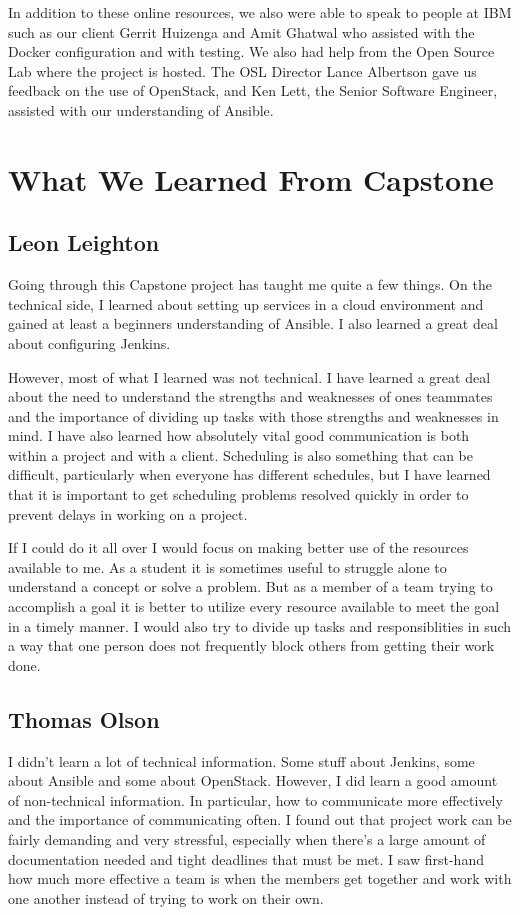 \documentclass[10pt,letterpaper,onecolumn,draftclsnofoot]{IEEEtran}
\begin{document}
In addition to these online resources, we also were able to speak to people at IBM such as our client Gerrit Huizenga
and Amit Ghatwal who assisted with the Docker configuration and with testing. We also had help from the Open Source
Lab where the project is hosted. The OSL Director Lance Albertson gave us feedback on the use of OpenStack, and Ken
Lett, the Senior Software Engineer, assisted with our understanding of Ansible.

\section{What We Learned From Capstone}
\subsection{Leon Leighton}
Going through this Capstone project has taught me quite a few things.
On the technical side, I learned about setting up services in a cloud environment and gained at least a beginners
understanding of Ansible. I also learned a great deal about configuring Jenkins. 

However, most of what I learned was not technical. 
I have learned a great deal about the need to understand the strengths and weaknesses of ones teammates 
and the importance of dividing up tasks with those strengths and weaknesses in mind. 
I have also learned how absolutely vital good communication is both within a project and with a client. 
Scheduling is also something that can be difficult, particularly when everyone has different schedules, but
I have learned that it is important to get scheduling problems resolved quickly in order to prevent delays
in working on a project.

If I could do it all over I would focus on making better use of the resources available to me.
As a student it is sometimes useful to struggle alone to understand a concept or solve a problem.
But as a member of a team trying to accomplish a goal it is better to utilize every resource available to 
meet the goal in a timely manner.
I would also try to divide up tasks and responsiblities in such a way that one person does not frequently 
block others from getting their work done. 


\subsection{Thomas Olson}
I didn't learn a lot of technical information. Some stuff about Jenkins, some about Ansible and some about OpenStack.
However, I did learn a good amount of non-technical information. In particular, how to communicate more effectively and
the importance of communicating often. I found out that project work can be fairly demanding and very stressful,
especially when there's a large amount of documentation needed and tight deadlines that must be met. I saw first-hand
how much more effective a team is when the members get together and work with one another instead of trying to work
on their own.
\end{document}
